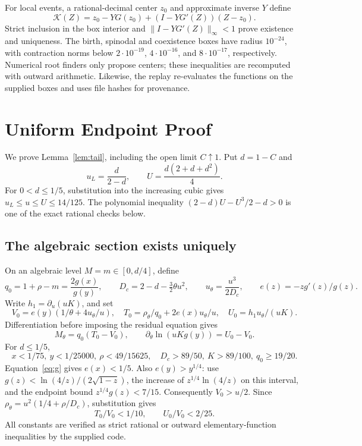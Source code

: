 \documentclass[12pt,letterpaper,onecolumn]{article}
\theoremstyle{definition}
\begin{document}
For local events, a rational-decimal center \(z_0\) and approximate inverse \(Y\) define
\[
\mathcal K(Z)=z_0-YG(z_0)+(I-YG'(Z))(Z-z_0).
\]
Strict inclusion in the box interior and \(\|I-YG'(Z)\|_\infty<1\) prove existence and uniqueness.
The birth, spinodal and coexistence boxes have radius \(10^{-24}\), with contraction norms below
\(2\cdot10^{-19}\), \(4\cdot10^{-16}\), and \(8\cdot10^{-17}\), respectively.
Numerical root finders only propose centers; these inequalities are recomputed with outward arithmetic.
Likewise, the replay re-evaluates the functions on the supplied boxes and uses file hashes for provenance.

\section{Uniform Endpoint Proof}\label{sec:tail}
We prove Lemma~\ref{lem:tail}, including the open limit \(C\uparrow1\).
Put \(d=1-C\) and
\[
u_L=\frac d{2-d},\qquad U=\frac{d(2+d+d^2)}4.
\]
For \(0<d\le1/5\), substitution into the increasing cubic gives
\(u_L\le u\le U\le14/125\).
The polynomial inequality
\((2-d)U-U^3/2-d>0\) is one of the exact rational checks below.

\subsection{The algebraic section exists uniquely}
On an algebraic level \(M=m\in[0,d/4]\), define
\[
q_0=1+\rho-m=\frac{2g(x)}{g(y)},\qquad
D_c=2-d-\tfrac32\theta u^2,\qquad
u_\theta=\frac{u^3}{2D_c},\qquad e(z)=-zg'(z)/g(z).
\]
Write \(h_1=\partial_u(uK)\), and set
\[
V_0=e(y)(1/\theta+4u_\theta/u),\quad
T_0=\rho_\theta/q_0+2e(x)u_\theta/u,\quad
U_0=h_1u_\theta/(uK).
\]
Differentiation before imposing the residual equation gives
\begin{equation}\label{eq:leveldiff}
M_\theta=q_0(T_0-V_0),\qquad
\partial_\theta\ln(uKg(y))=U_0-V_0.
\end{equation}
For \(d\le1/5\),
\[
x<1/75,\ y<1/25000,\ \rho<49/15625,\quad
D_c>89/50,\ K>89/100,\ q_0\ge19/20.
\]
Equation~\eqref{eq:g} gives \(e(x)<1/5\).
Also \(e(y)>y^{1/4}\): use
\(g(z)<\ln(4/z)/(2\sqrt{1-z})\), the increase of
\(z^{1/4}\ln(4/z)\) on this interval, and the endpoint bound
\(z^{1/4}g(z)<7/15\).
Consequently \(V_0>u/2\).
Since
\(\rho_\theta=u^2(1/4+\rho/D_c)\), substitution gives
\[
T_0/V_0<1/10,\qquad U_0/V_0<2/25.
\]
All constants are verified as strict rational or outward elementary-function inequalities by the supplied code.
\end{document}
